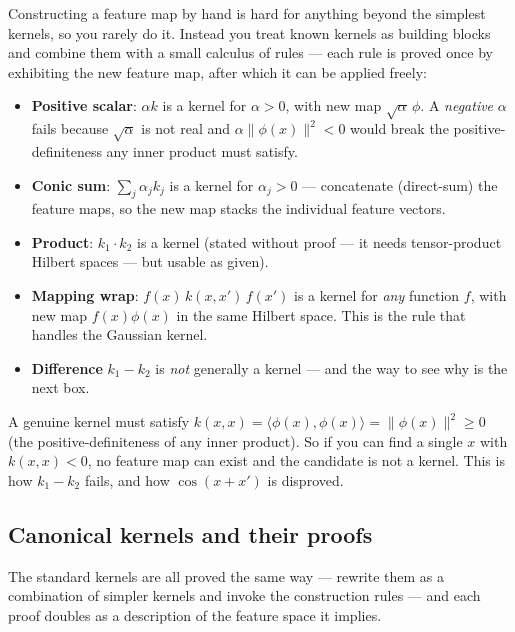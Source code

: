 \documentclass[11pt, a4paper]{article}
\newcommand{\kw}[1]{\textbf{#1}}
\begin{document}
Constructing a feature map by hand is hard for anything beyond the simplest kernels, so you rarely
do it. Instead you treat known kernels as building blocks and combine them with a small calculus of
rules — each rule is proved once by exhibiting the new feature map, after which it can be applied
freely:
\begin{itemize}
  \item \kw{Positive scalar}: $\alpha k$ is a kernel for $\alpha>0$, with new map
  $\sqrt\alpha\,\phi$. A \emph{negative} $\alpha$ fails because $\sqrt\alpha$ is not real and
  $\alpha\|\phi(x)\|^2<0$ would break the positive-definiteness any inner product must satisfy.
  \item \kw{Conic sum}: $\sum_j\alpha_j k_j$ is a kernel for $\alpha_j>0$ — concatenate (direct-sum)
  the feature maps, so the new map stacks the individual feature vectors.
  \item \kw{Product}: $k_1\cdot k_2$ is a kernel (stated without proof — it needs tensor-product
  Hilbert spaces — but usable as given).
  \item \kw{Mapping wrap}: $f(x)\,k(x,x')\,f(x')$ is a kernel for \emph{any} function $f$, with new
  map $f(x)\phi(x)$ in the same Hilbert space. This is the rule that handles the Gaussian kernel.
  \item \kw{Difference} $k_1-k_2$ is \emph{not} generally a kernel — and the way to see why is the
  next box.
\end{itemize}

\begin{trapbox}[the $x=x'$ trick — how to disprove a candidate kernel]
A genuine kernel must satisfy $k(x,x)=\langle\phi(x),\phi(x)\rangle=\|\phi(x)\|^2\ge0$ (the
positive-definiteness of any inner product). So if you can find a single $x$ with $k(x,x)<0$, no
feature map can exist and the candidate is not a kernel. This is how $k_1-k_2$ fails, and how
$\cos(x+x')$ is disproved.
\end{trapbox}

\subsection{Canonical kernels and their proofs}

The standard kernels are all proved the same way — rewrite them as a combination of simpler kernels
and invoke the construction rules — and each proof doubles as a description of the feature space it
implies.
\end{document}
